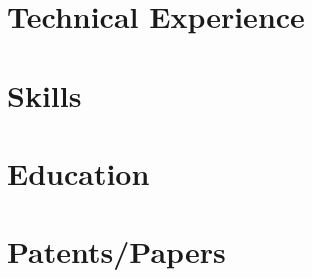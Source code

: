 \documentclass[letter,10pt]{article}
\begin{document}


\section{Technical Experience}


\section{Skills}


\section{Education}


\section{Patents/Papers}


% 
\end{document}
